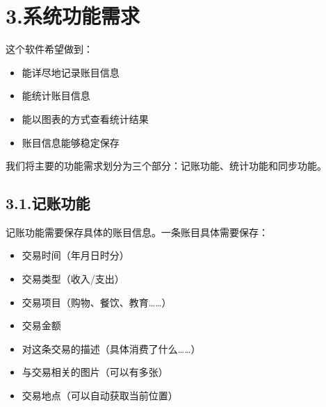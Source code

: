 \documentclass{article}
\begin{document}
\section{3.\hspace*{0.5em}系统功能需求}\label{section}%

\noindent{}这个软件希望做到：%

\begin{itemize}[noitemsep,topsep=\mdcompacttopsep]%

\item{}能详尽地记录账目信息%

\item{}能统计账目信息%

\item{}能以图表的方式查看统计结果%

\item{}账目信息能够稳定保存%
\end{itemize}%

\noindent{}我们将主要的功能需求划分为三个部分：记账功能、统计功能和同步功能。%

\subsection{3.1.\hspace*{0.5em}记账功能}\label{section}%

\noindent{}记账功能需要保存具体的账目信息。一条账目具体需要保存：%

\begin{itemize}[noitemsep,topsep=\mdcompacttopsep]%

\item{}交易时间（年月日时分）%

\item{}交易类型（收入/支出）%

\item{}交易项目（购物、餐饮、教育……）%

\item{}交易金额%

\item{}对这条交易的描述（具体消费了什么……）%

\item{}与交易相关的图片（可以有多张）%

\item{}交易地点（可以自动获取当前位置）%
\end{itemize}%
\end{document}
